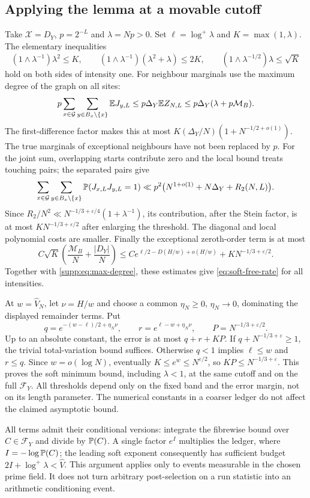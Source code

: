 \subsection{Applying the lemma at a movable cutoff}\label{supp:sec:soft-application}
Take $\mathcal X=D_Y$, $p=2^{-L}$ and $\lambda=Np>0$.
Set $\ell=\log^+\lambda$ and $K=\max(1,\lambda)$.
The elementary inequalities
\[
 (1\wedge\lambda^{-1})\lambda^2\le K,\qquad
 (1\wedge\lambda^{-1})(\lambda^2+\lambda)\le2K,\qquad
 (1\wedge\lambda^{-1/2})\lambda\le\sqrt K
\]
hold on both sides of intensity one.
For neighbour marginals use the maximum degree of the graph on all sites:
\[
 p\sum_{x\in\mathcal G}\sum_{y\in B_x\setminus\{x\}}\mathbb E J_{y,L}
 \le p\Delta_Y\mathbb E Z_{N,L}
 \le p\Delta_Y(\lambda+p\mathcal M_B).
\]
The first-difference factor makes this at most
$K(\Delta_Y/N)(1+N^{-1/2+o(1)})$.
The true marginals of exceptional neighbours have not been replaced by $p$.
For the joint sum, overlapping starts contribute zero and the local bound
treats touching pairs; the separated pairs give
\[
 \sum_{x\in\mathcal G}\sum_{y\in B_x\setminus\{x\}}
       \mathbb P(J_{x,L}J_{y,L}=1)
 \ll p^2\bigl(N^{1+o(1)}+N\Delta_Y+R_2(N,L)\bigr).
\]
Since $R_2/N^2\ll N^{-1/3+\varepsilon/4}(1+\lambda^{-1})$,
its contribution, after the Stein factor, is at most
$K N^{-1/3+\varepsilon/2}$ after enlarging the threshold.
The diagonal and local polynomial costs are smaller.
Finally the exceptional zeroth-order term is at most
\[
 C\sqrt K\left(\frac{\mathcal M_B}{N}+\frac{|D_Y|}{N}\right)
 \le C e^{\ell/2-D(H/w)+o(H/w)}+K N^{-1/3+\varepsilon/2}.
\]
Together with \eqref{supp:eq:max-degree}, these estimates give
\eqref{eq:soft-free-rate} for all intensities.

At $w=\widehat V_N$, let $\nu=H/w$ and choose a common $\eta_N\ge0$,
$\eta_N\to0$, dominating the displayed remainder terms. Put
\[
 q=e^{-(w-\ell)/2+\eta_N\nu},\qquad
 r=e^{\ell-w+\eta_N\nu},\qquad P=N^{-1/3+\varepsilon/2}.
\]
Up to an absolute constant, the error is at most $q+r+KP$.
If $q+N^{-1/3+\varepsilon}\ge1$, the trivial total-variation bound suffices.
Otherwise $q<1$ implies $\ell\le w$ and $r\le q$.
Since $w=o(\log N)$, eventually $K\le e^w\le N^{\varepsilon/2}$, so
$KP\le N^{-1/3+\varepsilon}$. This proves the soft minimum bound,
including $\lambda<1$, at the same cutoff and on the full $\mathcal F_Y$.
All thresholds depend only on the fixed band and the error margin, not on
its length parameter. The numerical constants in a coarser ledger do not
affect the claimed asymptotic bound.

All terms admit their conditional versions: integrate the fibrewise
bound over $C\in\mathcal F_Y$ and divide by $\mathbb P(C)$. A single factor
$e^I$ multiplies the ledger, where $I=-\log\mathbb P(C)$; the leading soft
exponent consequently has sufficient budget $2I+\log^+\lambda<\widehat V$.
This argument applies only to events measurable in the chosen prime
field. It does not turn arbitrary post-selection on a run statistic into
an arithmetic conditioning event.
